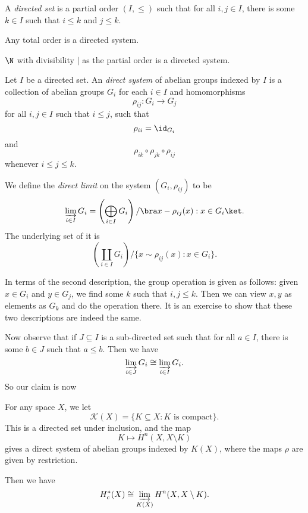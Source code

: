 \documentclass[a4paper]{article}
\begin{document}
\begin{defi}
  A \emph{directed set} is a partial order $(I, \leq)$ such that for all $i, j \in I$, there is some $k \in I$ such that $i \leq k$ and $j \leq k$.
\end{defi}

\begin{eg}
  Any total order is a directed system.
\end{eg}

\begin{eg}
  $\N$ with divisibility $\mid$ as the partial order is a directed system.
\end{eg}

\begin{defi}
  Let $I$ be a directed set. An \emph{direct system} of abelian groups indexed by $I$ is a collection of abelian groups $G_i$ for each $i \in I$ and homomorphisms
  \[
    \rho_{ij}: G_i \to G_j
  \]
  for all $i, j \in I$ such that $i \leq j$, such that
  \[
    \rho_{ii} = \id_{G_i}
  \]
  and
  \[
    \rho_{ik} \circ \rho_{jk} \circ \rho_{ij}
  \]
  whenever $i \leq j \leq k$.

  We define the \emph{direct limit} on the system $(G_i, \rho_{ij})$ to be
  \[
    \varinjlim_{i \in I} G_i = \left(\bigoplus_{i \in I} G_i\right)/\bra x - \rho_{ij}(x): x \in G_i\ket.
  \]
  The underlying set of it is
  \[
    \left(\coprod_{i \in I}G_i\right)/\{x \sim \rho_{ij}(x): x \in G_i\}.
  \]
\end{defi}
In terms of the second description, the group operation is given as follows: given $x \in G_i$ and $y \in G_j$, we find some $k$ such that $i, j \leq k$. Then we can view $x, y$ as elements as $G_k$ and do the operation there. It is an exercise to show that these two descriptions are indeed the same.

Now observe that if $J \subseteq I$ is a sub-directed set such that for all $a \in I$, there is some $b \in J$ such that $a \leq b$. Then we have
\[
  \varinjlim_{i \in J} G_i \cong \varinjlim_{i \in I} G_i.
\]
So our claim is now
\begin{thm}
  For any space $X$, we let
  \[
    \mathcal{K}(X) = \{K \subseteq X: K\text{ is compact}\}.
  \]
  This is a directed set under inclusion, and the map
  \[
    K \mapsto H^n(X, X \setminus K)
  \]
  gives a direct system of abelian groups indexed by $K(X)$, where the maps $\rho$ are given by restriction.

  Then we have
  \[
    H^*_c(X) \cong \varinjlim_{K(X)} H^n(X, X \setminus K).
  \]
\end{thm}
\end{document}
